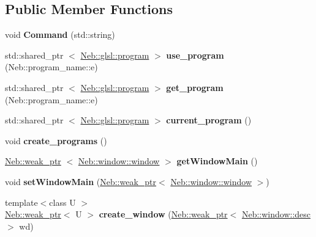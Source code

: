 \subsection*{\-Public \-Member \-Functions}
\begin{DoxyCompactItemize}
\item 
\hypertarget{classNeb_1_1master_a69a240d5d10bd1282d60d390bde4a6c3}{void {\bfseries \-Command} (std\-::string)}\label{classNeb_1_1master_a69a240d5d10bd1282d60d390bde4a6c3}

\item 
\hypertarget{classNeb_1_1master_a7d68e547d429d4a89a2317b501bd0d1f}{std\-::shared\-\_\-ptr\*
$<$ \hyperlink{classNeb_1_1glsl_1_1program}{\-Neb\-::glsl\-::program} $>$ {\bfseries use\-\_\-program} (\-Neb\-::program\-\_\-name\-::e)}\label{classNeb_1_1master_a7d68e547d429d4a89a2317b501bd0d1f}

\item 
\hypertarget{classNeb_1_1master_acb05bbf71681242d09100fe638d1e588}{std\-::shared\-\_\-ptr\*
$<$ \hyperlink{classNeb_1_1glsl_1_1program}{\-Neb\-::glsl\-::program} $>$ {\bfseries get\-\_\-program} (\-Neb\-::program\-\_\-name\-::e)}\label{classNeb_1_1master_acb05bbf71681242d09100fe638d1e588}

\item 
\hypertarget{classNeb_1_1master_ad3c0bc9747d5da405283ff311716330f}{std\-::shared\-\_\-ptr\*
$<$ \hyperlink{classNeb_1_1glsl_1_1program}{\-Neb\-::glsl\-::program} $>$ {\bfseries current\-\_\-program} ()}\label{classNeb_1_1master_ad3c0bc9747d5da405283ff311716330f}

\item 
\hypertarget{classNeb_1_1master_ab476009c6503f6548a64dce36937b33e}{void {\bfseries create\-\_\-programs} ()}\label{classNeb_1_1master_ab476009c6503f6548a64dce36937b33e}

\item 
\hypertarget{classNeb_1_1master_a7cb5aa40db01f7dfc04ac61b6bf95284}{\hyperlink{classNeb_1_1weak__ptr}{\-Neb\-::weak\-\_\-ptr}\*
$<$ \hyperlink{classNeb_1_1window_1_1window}{\-Neb\-::window\-::window} $>$ {\bfseries get\-Window\-Main} ()}\label{classNeb_1_1master_a7cb5aa40db01f7dfc04ac61b6bf95284}

\item 
\hypertarget{classNeb_1_1master_acb32c1ad9d093ee430cedd0c99287730}{void {\bfseries set\-Window\-Main} (\hyperlink{classNeb_1_1weak__ptr}{\-Neb\-::weak\-\_\-ptr}$<$ \hyperlink{classNeb_1_1window_1_1window}{\-Neb\-::window\-::window} $>$)}\label{classNeb_1_1master_acb32c1ad9d093ee430cedd0c99287730}

\item 
\hypertarget{classNeb_1_1master_a051b4bc7c8dd79e8b9d303ed3f4ec539}{{\footnotesize template$<$class U $>$ }\\\hyperlink{classNeb_1_1weak__ptr}{\-Neb\-::weak\-\_\-ptr}$<$ \-U $>$ {\bfseries create\-\_\-window} (\hyperlink{classNeb_1_1weak__ptr}{\-Neb\-::weak\-\_\-ptr}$<$ \hyperlink{classNeb_1_1window_1_1desc}{\-Neb\-::window\-::desc} $>$ wd)}\label{classNeb_1_1master_a051b4bc7c8dd79e8b9d303ed3f4ec539}

\end{DoxyCompactItemize}
